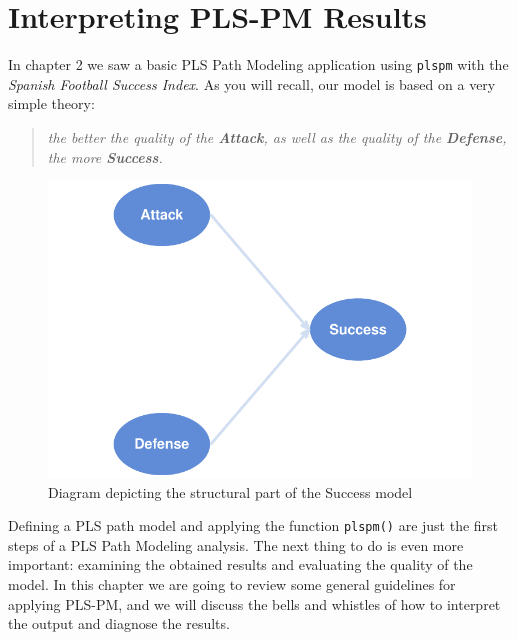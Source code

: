 \documentclass[12pt]{book}\usepackage{graphicx, color}
\newenvironment{knitrout}{}{} %
\newcommand{\plspm}{\texttt{plspm}}
\newcommand{\fplspm}{\texttt{plspm()}}
\begin{document}



\chapter{Interpreting PLS-PM Results}
In chapter 2 we saw a basic PLS Path Modeling application using \plspm{} with the \textit{Spanish Football Success Index}. As you will recall, our model is based on a very simple theory:
\begin{quotation} \noindent
\textit{the better the quality of the \textbf{Attack}, as well as the quality of the \textbf{Defense}, the more \textbf{Success}.}
\end{quotation}





\begin{knitrout}
\color{fgcolor}\begin{figure}[h]


{\centering \includegraphics[width=.7\linewidth,height=.4\linewidth]{figure/success_inner_model_reminder} 

}

\caption[Diagram depicting the structural part of the Success model]{Diagram depicting the structural part of the Success model\label{fig:success_inner_model_reminder}}
\end{figure}


\end{knitrout}



Defining a PLS path model and applying the function \fplspm{} are just the first steps of a PLS Path Modeling analysis. The next thing to do is even more important: examining the obtained results and evaluating the quality of the model. In this chapter we are going to review some general guidelines for applying PLS-PM, and we will discuss the bells and whistles of how to interpret the output and diagnose the results.
\end{document}
